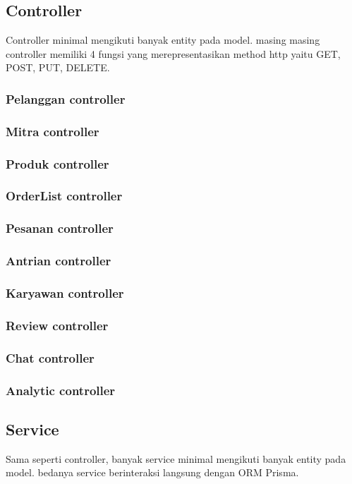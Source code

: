 \subsection{Controller}
Controller minimal mengikuti banyak entity pada model. masing masing controller memiliki 4 fungsi yang merepresentasikan method http yaitu GET, POST, PUT, DELETE.
\subsubsection{Pelanggan controller}
\subsubsection{Mitra controller}
\subsubsection{Produk controller}
\subsubsection{OrderList controller}
\subsubsection{Pesanan controller}
\subsubsection{Antrian controller}
\subsubsection{Karyawan controller}
\subsubsection{Review controller}
\subsubsection{Chat controller}
\subsubsection{Analytic controller}

\subsection{Service}
Sama seperti controller, banyak service minimal mengikuti banyak entity pada model.
bedanya service berinteraksi langsung dengan ORM Prisma.
